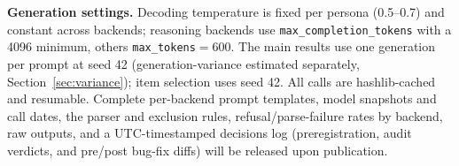 \documentclass[manuscript,nonacm]{acmart}
\begin{document}
\textbf{Generation settings.} Decoding temperature is fixed per persona (0.5--0.7) and constant across
backends; reasoning backends use \texttt{max\_completion\_tokens} with a 4096 minimum, others
\texttt{max\_tokens}$=600$. The main results use one generation per prompt at seed 42 (generation-variance
estimated separately, Section~\ref{sec:variance}); item selection uses seed 42. All calls are hashlib-cached
and resumable. Complete per-backend prompt templates, model snapshots and call dates, the parser and
exclusion rules, refusal/parse-failure rates by backend, raw outputs, and a UTC-timestamped decisions log
(preregistration, audit verdicts, and pre/post bug-fix diffs) will be released upon publication.
\end{document}
